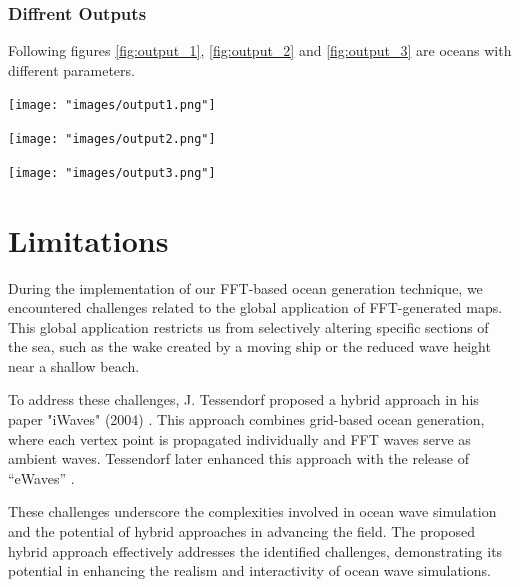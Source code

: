 \subsubsection{Diffrent Outputs}
Following figures \ref{fig:output_1}, \ref{fig:output_2} and \ref{fig:output_3} are oceans with different parameters.

\begin{minipage}[t]{1\textwidth}
    \centering
    \texttt{[image: "images/output1.png"]}
    \label{fig:output_1}
\end{minipage}
\begin{minipage}[t]{1\textwidth}
    \centering
    \texttt{[image: "images/output2.png"]}
    \label{fig:output_2}
\end{minipage}

\begin{minipage}{1\textwidth}
    \centering
    \texttt{[image: "images/output3.png"]}
    \label{fig:output_3}
\end{minipage}

\section{Limitations}
During the implementation of our FFT-based ocean generation technique, we encountered challenges related to the global application of FFT-generated maps. This global application restricts us from selectively altering specific sections of the sea, such as the wake created by a moving ship or the reduced wave height near a shallow beach.

To address these challenges, J. Tessendorf proposed a hybrid approach in his paper "iWaves" (2004) \cite{tessendorf2004}. This approach combines grid-based ocean generation, where each vertex point is propagated individually and FFT waves serve as ambient waves. Tessendorf later enhanced this approach with the release of “eWaves” \cite{tessendorf2014}.

These challenges underscore the complexities involved in ocean wave simulation and the potential of hybrid approaches in advancing the field. The proposed hybrid approach effectively addresses the identified challenges, demonstrating its potential in enhancing the realism and interactivity of ocean wave simulations.